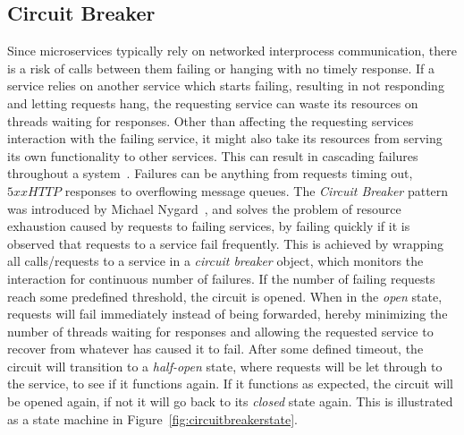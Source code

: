 \subsection{Circuit Breaker}
Since microservices typically rely on networked interprocess communication,
there is a risk of calls between them failing or hanging with no timely
response.
If a service relies on another service which starts failing, resulting in not
responding and letting requests hang, the requesting service can waste its
resources on threads waiting for responses. Other than affecting the requesting
services interaction with the failing service, it might also take its resources
from serving its own functionality to other services. This can result in
cascading failures throughout a system~\cite{fowler2014blog}.
Failures can be anything from requests timing out, $5xx HTTP$ responses to
overflowing message queues. 
\newline\newline
The \textit{Circuit Breaker} pattern was introduced by Michael
Nygard~\cite{nygard2007release}, and solves the problem of resource exhaustion
caused by requests to failing services, by failing quickly if it is observed
that requests to a service fail frequently. 
This is achieved by wrapping all calls/requests to a service in a
\textit{circuit breaker} object, which monitors the interaction for continuous
number of failures. 
If the number of failing requests reach some predefined threshold, the circuit
is opened. 
\newline\newline
When in the \textit{open} state, requests will fail immediately instead of being
forwarded, hereby minimizing the number of threads waiting for responses and
allowing the requested service to recover from whatever has caused it to fail.
After some defined timeout, the circuit will transition to a \textit{half-open}
state, where requests will be let through to the service, to see if it functions
again. If it functions as expected, the circuit will be opened again, if not it
will go back to its \textit{closed} state again. This is illustrated as a state
machine in Figure~\ref{fig:circuitbreakerstate}.

